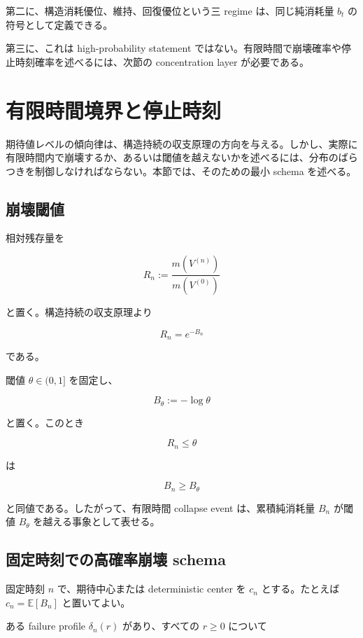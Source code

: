 \documentclass[12pt,a4paper]{article}
\begin{document}
第二に、構造消耗優位、維持、回復優位という三 regime は、同じ純消耗量 \(b_{t}\) の符号として定義できる。

第三に、これは high-probability statement ではない。有限時間で崩壊確率や停止時刻確率を述べるには、次節の concentration layer が必要である。

\section{有限時間境界と停止時刻}\label{ux6709ux9650ux6642ux9593ux5883ux754cux3068ux505cux6b62ux6642ux523b}

期待値レベルの傾向律は、構造持続の収支原理の方向を与える。しかし、実際に有限時間内で崩壊するか、あるいは閾値を越えないかを述べるには、分布のばらつきを制御しなければならない。本節では、そのための最小 schema を述べる。

\subsection{崩壊閾値}\label{ux5d29ux58caux95beux5024}

相対残存量を

\[
R_{n} := \frac{m(V^{(n)})}{m(V^{(0)})}
\]

と置く。構造持続の収支原理より

\[
R_{n} = e^{-B_{n}}
\]

である。

閾値 \(\theta\in(0,1]\) を固定し、

\[
B_\theta := -\log \theta
\]

と置く。このとき

\[
R_{n} \le \theta
\]

は

\[
B_{n} \ge B_\theta
\]

と同値である。したがって、有限時間 collapse event は、累積純消耗量 \(B_{n}\) が閾値 \(B_\theta\) を越える事象として表せる。

\subsection{固定時刻での高確率崩壊 schema}\label{ux56faux5b9aux6642ux523bux3067ux306eux9ad8ux78baux7387ux5d29ux58ca-schema}

固定時刻 \(n\) で、期待中心または deterministic center を \(c_{n}\) とする。たとえば \(c_{n}=\mathbb E[B_{n}]\) と置いてよい。

ある failure profile \(\delta_{n}(r)\) があり、すべての \(r\ge 0\) について
\end{document}
